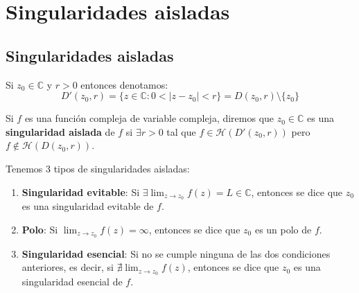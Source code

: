 \section{Singularidades aisladas}
\subsection{Singularidades aisladas}

Si $z_0 \in \mathbb{C}$ y $r >0$ entonces denotamos:
\[
D'(z_0, r) = \{ z \in \mathbb{C} : 0 < |z-z_0| < r\} = D(z_0, r) \setminus \{z_0\}
\]

\begin{definición}
    Si $f$ es una función compleja de variable compleja, diremos que $z_0 \in \mathbb{C}$ es una \textbf{singularidad aislada} de $f$ si $\exists r > 0$ tal que $f \in \mathcal{H}(D'(z_0, r))$ pero $f \notin \mathcal{H}(D(z_0, r))$.
\end{definición}


\begin{definición}
    Tenemos 3 tipos de singularidades aisladas:
    \begin{enumerate}
        \item \textbf{Singularidad evitable}: Si $\exists \lim_{z \to z_0} f(z) = L \in \mathbb{C}$, entonces se dice que $z_0$ es una singularidad evitable de $f$.
        \item \textbf{Polo}: Si $\lim_{z \to z_0} f(z) = \infty$, entonces se dice que $z_0$ es un polo de $f$.
        \item \textbf{Singularidad esencial}: Si no se cumple ninguna de las dos condiciones anteriores, es decir, si $ \nexists \lim_{z \to z_0} f(z)$, entonces se dice que $z_0$ es una singularidad esencial de $f$.
    \end{enumerate}
\end{definición}

